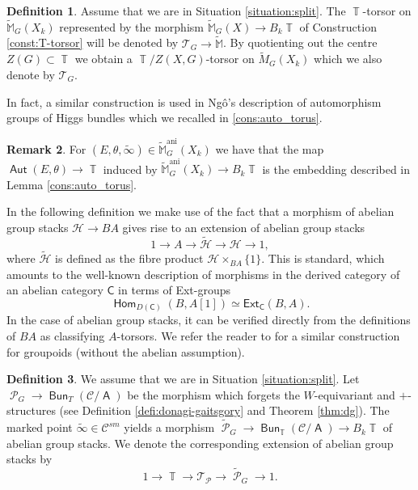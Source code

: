 \documentclass{article}
\DeclareMathOperator{\Hom}{\mathsf{Hom}}
\DeclareMathOperator{\Bun}{\mathsf{Bun}}
\DeclareMathOperator{\A}{\mathsf{A}}
\newcommand{\Cc}{\mathcal{C}}
\DeclareMathOperator{\ani}{ani}
\newcommand{\C}{\mathsf{C}}
\DeclareMathOperator{\Aut}{\mathsf{Aut}}
\DeclareMathOperator{\Tb}{\mathbb{T}}
\DeclareMathOperator{\Pc}{\mathcal{P}}
\theoremstyle{definition}
\newtheorem{definition}{Definition}[section]
\newtheorem{rmk}[definition]{Remark}
\theoremstyle{plain}
\begin{document}
\begin{definition}\label{defi:T-torsor}
Assume that we are in Situation \ref{situation:split}. The $\Tb$-torsor on $\widetilde{\mathbb{M}}_G(X_k)$ represented by the morphism $\widetilde{\mathbb{M}}_G(X) \to B_k\Tb$ of Construction \ref{const:T-torsor} will be denoted by $\mathcal{T}_G \to \widetilde{\mathbb{M}}$. By quotienting out the centre $Z(G) \subset \Tb$ we obtain a $\Tb/Z(X,G)$-torsor on $\widetilde{M}_G(X_k)$ which we also denote by $\mathcal{T}_G$.
\end{definition}

In fact, a similar construction is used in Ng\^o's description of automorphism groups of Higgs bundles which we recalled in \ref{cons:auto_torus}. 

\begin{rmk}\label{rmk:auto}
For $(E,\theta,\widetilde{\infty}) \in \widetilde{\mathbb{M}}_G^{\ani}(X_k)$ we have that the map $\Aut(E,\theta) \to \Tb$ induced by $\widetilde{\mathbb{M}}_G^{\ani}(X_k) \to B_k\Tb$ is the embedding described in Lemma \ref{cons:auto_torus}.
\end{rmk}

In the following definition we make use of the fact that a morphism of abelian group stacks $\mathcal{H} \to BA$ gives rise to an extension of abelian group stacks 
$$1 \to A \to \widetilde{\mathcal{H}} \to \mathcal{H} \to 1,$$
where $\widetilde{\mathcal{H}}$ is defined as the fibre product $\mathcal{H} \times_{BA} \{1\}$. This is standard, which amounts to the well-known description of morphisms in the derived category of an abelian category $\C$ in terms of Ext-groups 
$$\Hom_{D(\C)}(B,A[1]) \simeq \mathsf{Ext}_{\C}(B,A).$$
In the case of abelian group stacks, it can be verified directly from the definitions of $BA$ as classifying $A$-torsors. We refer the reader to \cite[2.A4]{MR1988970} for a similar construction for groupoids (without the abelian assumption).
\begin{definition}\label{defi:T-torsor2}
We assume that we are in Situation \ref{situation:split}. Let $\Pc_G \to \Bun_{T}(\Cc/\A)$ be the morphism which forgets the $W$-equivariant and $+$-structures (see Definition \ref{defi:donagi-gaitsgory} and Theorem \ref{thm:dg}). The marked point $\widetilde{\infty} \in \Cc^{sm}$ yields a morphism $\widetilde{\Pc}_G \to \Bun_{\Tb}(\Cc/\A) \to B_k\Tb$ of abelian group stacks. We denote the corresponding extension of abelian group stacks by 
$$1 \to \Tb \to \mathcal{T}_{\Pc} \to \widetilde{\Pc}_G \to 1.$$
\end{definition}
\end{document}
